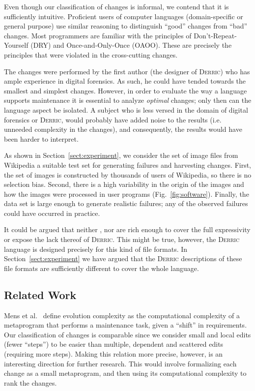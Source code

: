 \documentclass[a4paper]{llncs}
\def\derric{\textsc{Derric}\xspace}
\newcommand{\JPEG}{\textsmaller{JPEG}\xspace}
\newcommand{\GIF}{\textsmaller{GIF}\xspace}
\newcommand{\PNG}{\textsmaller{PNG}\xspace}
\begin{document}
\noindent
Even though our classification of changes is informal, we contend that it is sufficiently intuitive.
Proficient users of computer languages (domain-specific or general purpose) use similar reasoning to distinguish ``good'' changes from ``bad'' changes. 
Most programmers are familiar with the principles of Don't-Repeat-Yourself (DRY) and Once-and-Only-Once (OAOO).
These are precisely the principles that were violated in the cross-cutting changes.

The changes were performed by the first author (the designer of \derric) who has ample experience in digital forensics. 
As such, he could have tended towards the smallest and simplest changes. 
However, in order to evaluate the way a language supports maintenance it is essential to analyze \textit{optimal} changes; only then can the language aspect be isolated.
A subject who is less versed in the domain of digital forensics or \derric, would probably have added noise to the results (i.e. unneeded complexity in the changes), and consequently, the results would have been harder to interpret.

As shown in Section~\ref{sect:experiment}, we consider the set of image files from Wikipedia a suitable test set for generating failures and harvesting changes.
First, the set of images is constructed by thousands of users of Wikipedia, so there is no selection bias.
Second, there is a high variability in the origin of the images and how the images were processed in user programs (Fig.~\ref{fig:software}). 
Finally, the data set is large enough to generate realistic failures; any of the observed failures could have occurred in practice. 

It could be argued that neither \JPEG, \GIF nor \PNG are rich enough to cover the full expressivity  or expose the lack thereof of \derric. 
This might be true, however, the \derric language is designed precisely for this kind of file formats. 
In Section~\ref{sect:experiment} we have argued that the \derric descriptions of these file formats are sufficiently different to cover the whole language.

\subsection{Related Work}

\noindent
Mens et al.~\cite{evolcomplexity} define evolution complexity as the computational complexity of a metaprogram that performs a maintenance task, given a ``shift'' in requirements.
Our classification of changes is comparable since we consider small and local edits (fewer ``steps'') to be easier than multiple, dependent and scattered edits (requiring more steps).
Making this relation more precise, however, is an interesting direction for further research. 
This would involve formalizing each change as a small metaprogram, and then using its computational complexity to rank the changes.
\end{document}
